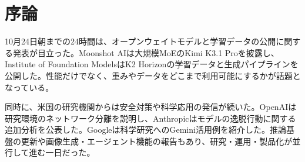 \section*{序論}
10月24日朝までの24時間は、オープンウェイトモデルと学習データの公開に関する発表が目立った。Moonshot AIは大規模MoEのKimi K3.1 Proを披露し、Institute of Foundation ModelsはK2 Horizonの学習データと生成パイプラインを公開した。性能だけでなく、重みやデータをどこまで利用可能にするかが話題となっている。

同時に、米国の研究機関からは安全対策や科学応用の発信が続いた。OpenAIは研究環境のネットワーク分離を説明し、Anthropicはモデルの逸脱行動に関する追加分析を公表した。Googleは科学研究へのGemini活用例を紹介した。推論基盤の更新や画像生成・エージェント機能の報告もあり、研究・運用・製品化が並行して進む一日だった。
